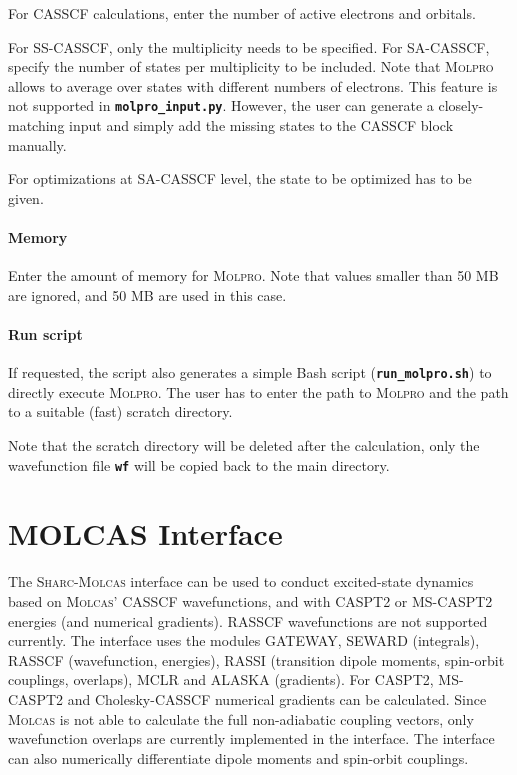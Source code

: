 \documentclass[a4paper,11pt,DIV=15,openany,twoside=false]{scrbook}
\newcommand{\sharc}{\textsc{Sharc}}
\newcommand{\ttt}[1]{\textbf{\texttt{#1}}}
\begin{document}
For CASSCF calculations, enter the number of active electrons and orbitals. 

For SS-CASSCF, only the multiplicity needs to be specified. For SA-CASSCF, specify the number of states per multiplicity to be included. Note that \textsc{Molpro} allows to average over states with different numbers of electrons. This feature is not supported in \ttt{molpro\_input.py}. However, the user can generate a closely-matching input and simply add the missing states to the CASSCF block manually. 

For optimizations at SA-CASSCF level, the state to be optimized has to be given.

\paragraph{Memory}

Enter the amount of memory for \textsc{Molpro}. Note that values smaller than 50 MB are ignored, and 50 MB are used in this case.

\paragraph{Run script}

If requested, the script also generates a simple Bash script (\ttt{run\_molpro.sh}) to directly execute \textsc{Molpro}. The user has to enter the path to \textsc{Molpro} and the path to a suitable (fast) scratch directory. 

Note that the scratch directory will be deleted after the calculation, only the wavefunction file \ttt{wf} will be copied back to the main directory.


\section{MOLCAS Interface}\label{sec:int:molcas}

The \sharc-\textsc{Molcas} interface can be used to conduct excited-state dynamics based on \textsc{Molcas}' CASSCF wavefunctions, and with CASPT2 or MS-CASPT2 energies (and numerical gradients). RASSCF wavefunctions are not supported currently. The interface uses the modules GATEWAY, SEWARD (integrals), RASSCF (wavefunction, energies), RASSI (transition dipole moments, spin-orbit couplings, overlaps), MCLR and ALASKA (gradients). For CASPT2, MS-CASPT2 and Cholesky-CASSCF numerical gradients can be calculated. Since \textsc{Molcas} is not able to calculate the full non-adiabatic coupling vectors, only wavefunction overlaps are currently implemented in the interface. The interface can also numerically differentiate dipole moments and spin-orbit couplings.
\end{document}
